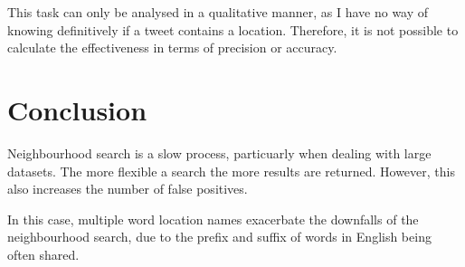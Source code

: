 \documentclass[a4paper]{article}
\begin{document}
This task can only be analysed in a qualitative manner, as I have no way of knowing definitively if a tweet contains a location. Therefore, it is not possible to calculate the effectiveness in terms of precision or accuracy.

\section{Conclusion}
Neighbourhood search is a slow process, particuarly when dealing with large datasets. The more flexible a search the more results are returned. However, this also increases the number of false positives.

In this case, multiple word location names exacerbate the downfalls of the neighbourhood search, due to the prefix and suffix of words in English being often shared.
\end{document}
